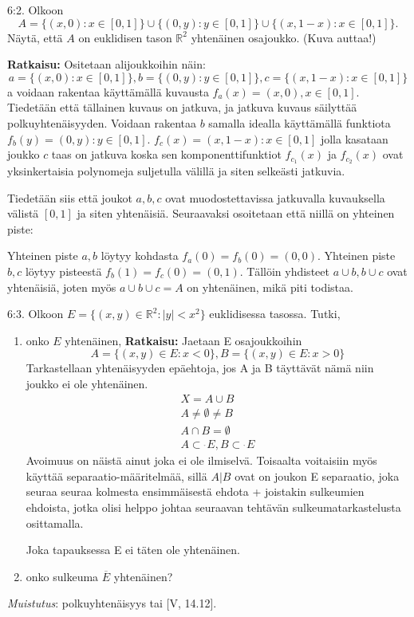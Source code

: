 \documentclass[12pt,a4paper,leqno]{amsart}
\newcommand{\oss}{\operatorname{\subset\!\!\!\!_{^{^\circ}}}}
\begin{document}
\bigskip

6:2. Olkoon
\[
A = \{(x,0): x \in [0,1]\} \cup \{(0,y): y \in [0,1]\} \cup \{(x,1-x): x \in [0,1]\}.
\]
Näytä, että $A$ on euklidisen tason $\mathbb R^2$ yhtenäinen osajoukko.
(Kuva auttaa!)

\textbf{Ratkaisu:}
Ositetaan alijoukkoihin näin:
\[
a = \{(x,0): x \in [0,1]\}, b= \{(0,y): y \in [0,1]\}, c= \{(x,1-x): x \in [0,1]\}
\]
a voidaan rakentaa käyttämällä kuvausta $f_a(x) = (x, 0), x \in [0, 1]$. Tiedetään että tällainen kuvaus on jatkuva, ja jatkuva kuvaus säilyttää polkuyhtenäisyyden. Voidaan rakentaa $b$ samalla idealla käyttämällä funktiota $f_b(y) = (0, y) : y \in [0, 1]$. $f_c(x) = (x, 1-x) : x \in [0, 1]$ jolla kasataan joukko $c$ taas on jatkuva koska sen komponenttifunktiot $f_{c_1}(x)$ ja $f_{c_2}(x)$ ovat yksinkertaisia polynomeja suljetulla välillä ja siten selkeästi jatkuvia.

Tiedetään siis että joukot $a, b, c$ ovat muodostettavissa jatkuvalla kuvauksella välistä $[0, 1]$ ja siten yhtenäisiä. Seuraavaksi osoitetaan että niillä on yhteinen piste:

Yhteinen piste $a, b$ löytyy kohdasta $f_a(0) = f_b(0) = (0, 0) $. Yhteinen piste $b, c$ löytyy pisteestä $f_b(1) = f_c(0) = (0, 1)$. Tällöin yhdisteet $a \cup b, b \cup c$ ovat yhtenäisiä, joten myös $a \cup b \cup c = A$ on yhtenäinen, mikä piti todistaa.
\bigskip

6:3.  Olkoon $E = \{(x,y) \in \mathbb R^2: \vert y \vert < x^2\}$ euklidisessa tasossa. Tutki, 

\begin{enumerate}
\item onko $E$ yhtenäinen, 
\textbf{Ratkaisu: }
Jaetaan E osajoukkoihin \[A = \{(x, y) \in E : x < 0\}, B = \{(x, y) \in E: x > 0  \} \]
Tarkastellaan yhtenäisyyden epäehtoja, jos A ja B täyttävät nämä niin joukko ei ole yhtenäinen.
\begin{align*}
    X = A \cup B \\
    A \neq \emptyset \neq B \\
    A \cap B = \emptyset \\
    A \oss E, B \oss E
\end{align*}
Avoimuus on näistä ainut joka ei ole ilmiselvä. Toisaalta voitaisiin myös käyttää separaatio-määritelmää, sillä $A | B$ ovat on joukon E separaatio, joka seuraa seuraa kolmesta ensimmäisestä ehdota + joistakin sulkeumien ehdoista, jotka olisi helppo johtaa seuraavan tehtävän sulkeumatarkastelusta osittamalla.

Joka tapauksessa E ei täten ole yhtenäinen.
\smallskip

\item onko sulkeuma $\overline{E}$ yhtenäinen?
\end{enumerate}
\textit{Muistutus}: polkuyhtenäisyys tai [V, 14.12].
\end{document}
